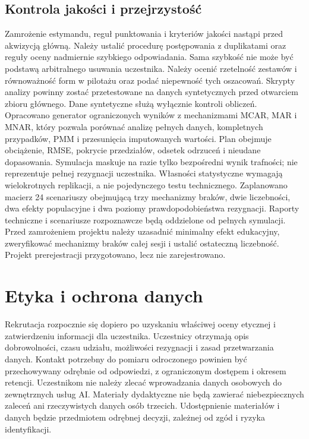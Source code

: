 \documentclass[11pt,a4paper]{article}
\begin{document}
\subsection{Kontrola jakości i przejrzystość}
Zamrożenie estymandu, reguł punktowania i kryteriów jakości nastąpi przed akwizycją główną. Należy ustalić procedurę postępowania z duplikatami oraz reguły oceny nadmiernie szybkiego odpowiadania. Sama szybkość nie może być podstawą arbitralnego usuwania uczestnika. Należy ocenić rzetelność zestawów i równoważność form w pilotażu oraz podać niepewność tych oszacowań. Skrypty analizy powinny zostać przetestowane na danych syntetycznych przed otwarciem zbioru głównego. Dane syntetyczne służą wyłącznie kontroli obliczeń. Opracowano generator ograniczonych wyników z mechanizmami MCAR, MAR i MNAR, który pozwala porównać analizę pełnych danych, kompletnych przypadków, PMM i przesunięcia imputowanych wartości. Plan obejmuje obciążenie, RMSE, pokrycie przedziałów, odsetek odrzuceń i nieudane dopasowania. Symulacja maskuje na razie tylko bezpośredni wynik trafności; nie reprezentuje pełnej rezygnacji uczestnika. Własności statystyczne wymagają wielokrotnych replikacji, a nie pojedynczego testu technicznego. Zaplanowano macierz 24 scenariuszy obejmującą trzy mechanizmy braków, dwie liczebności, dwa efekty populacyjne i dwa poziomy prawdopodobieństwa rezygnacji. Raporty techniczne i scenariusze rozpoznawcze będą oddzielone od pełnych symulacji. Przed zamrożeniem projektu należy uzasadnić minimalny efekt edukacyjny, zweryfikować mechanizmy braków całej sesji i ustalić ostateczną liczebność. Projekt prerejestracji przygotowano, lecz nie zarejestrowano.

\section{Etyka i ochrona danych}
Rekrutacja rozpocznie się dopiero po uzyskaniu właściwej oceny etycznej i zatwierdzeniu informacji dla uczestnika. Uczestnicy otrzymają opis dobrowolności, czasu udziału, możliwości rezygnacji i zasad przetwarzania danych. Kontakt potrzebny do pomiaru odroczonego powinien być przechowywany odrębnie od odpowiedzi, z ograniczonym dostępem i okresem retencji. Uczestnikom nie należy zlecać wprowadzania danych osobowych do zewnętrznych usług AI. Materiały dydaktyczne nie będą zawierać niebezpiecznych zaleceń ani rzeczywistych danych osób trzecich. Udostępnienie materiałów i danych będzie przedmiotem odrębnej decyzji, zależnej od zgód i ryzyka identyfikacji.
\end{document}
